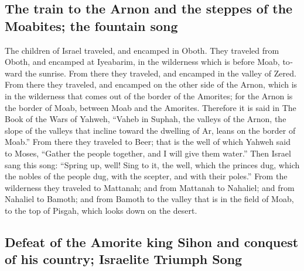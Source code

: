 \begin{paracol}{2}
\begin{otherlanguage}{english}
\hypertarget{the-train-to-the-arnon-and-the-steppes-of-the-moabites-the-fountain-song}{%
\subsection{The train to the Arnon and the steppes of the Moabites; the
fountain
song}\label{the-train-to-the-arnon-and-the-steppes-of-the-moabites-the-fountain-song}}

 The children of Israel traveled, and encamped in Oboth.
 They traveled from Oboth, and encamped at Iyeabarim, in
the wilderness which is before Moab, toward the sunrise. 
From there they traveled, and encamped in the valley of Zered.
 From there they traveled, and encamped on the other side
of the Arnon, which is in the wilderness that comes out of the border of
the Amorites; for the Arnon is the border of Moab, between Moab and the
Amorites.  Therefore it is said in The Book of the Wars
of Yahweh, ``Vaheb in Suphah, the valleys of the Arnon, 
the slope of the valleys that incline toward the dwelling of Ar, leans
on the border of Moab.''  From there they traveled to
Beer; that is the well of which Yahweh said to Moses, ``Gather the
people together, and I will give them water.''  Then
Israel sang this song: ``Spring up, well! Sing to it, 
the well, which the princes dug, which the nobles of the people dug,
with the scepter, and with their poles.'' From the wilderness they
traveled to Mattanah;  and from Mattanah to Nahaliel; and
from Nahaliel to Bamoth;  and from Bamoth to the valley
that is in the field of Moab, to the top of Pisgah, which looks down on
the desert.

\hypertarget{defeat-of-the-amorite-king-sihon-and-conquest-of-his-country-israelite-triumph-song}{%
\subsection{Defeat of the Amorite king Sihon and conquest of his
country; Israelite Triumph
Song}\label{defeat-of-the-amorite-king-sihon-and-conquest-of-his-country-israelite-triumph-song}}


\end{otherlanguage}
\end{paracol}

